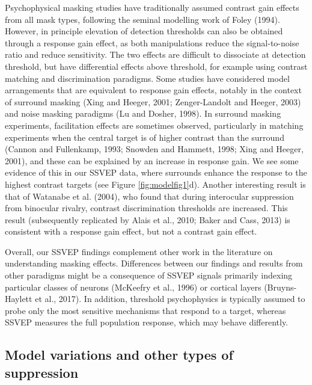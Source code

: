 \documentclass[]{article}
\begin{document}
Psychophysical masking studies have traditionally assumed contrast gain effects from all mask types, following the seminal modelling work of Foley (1994). However, in principle elevation of detection thresholds can also be obtained through a response gain effect, as both manipulations reduce the signal-to-noise ratio and reduce sensitivity. The two effects are difficult to dissociate at detection threshold, but have differential effects above threshold, for example using contrast matching and discrimination paradigms. Some studies have considered model arrangements that are equivalent to response gain effects, notably in the context of surround masking (Xing and Heeger, 2001; Zenger-Landolt and Heeger, 2003) and noise masking paradigms (Lu and Dosher, 1998). In surround masking experiments, facilitation effects are sometimes observed, particularly in matching experiments when the central target is of higher contrast than the surround (Cannon and Fullenkamp, 1993; Snowden and Hammett, 1998; Xing and Heeger, 2001), and these can be explained by an increase in response gain. We see some evidence of this in our SSVEP data, where surrounds enhance the response to the highest contrast targets (see Figure \ref{fig:modelfig1}d). Another interesting result is that of Watanabe et al. (2004), who found that during interocular suppression from binocular rivalry, contrast discrimination thresholds are increased. This result (subsequently replicated by Alais et al., 2010; Baker and Cass, 2013) is consistent with a response gain effect, but not a contrast gain effect.

Overall, our SSVEP findings complement other work in the literature on understanding masking effects. Differences between our findings and results from other paradigms might be a consequence of SSVEP signals primarily indexing particular classes of neurons (McKeefry et al., 1996) or cortical layers (Bruyns-Haylett et al., 2017). In addition, threshold psychophysics is typically assumed to probe only the most sensitive mechanisms that respond to a target, whereas SSVEP measures the full population response, which may behave differently.

\hypertarget{model-variations-and-other-types-of-suppression}{%
\subsection{Model variations and other types of suppression}\label{model-variations-and-other-types-of-suppression}}
\end{document}
